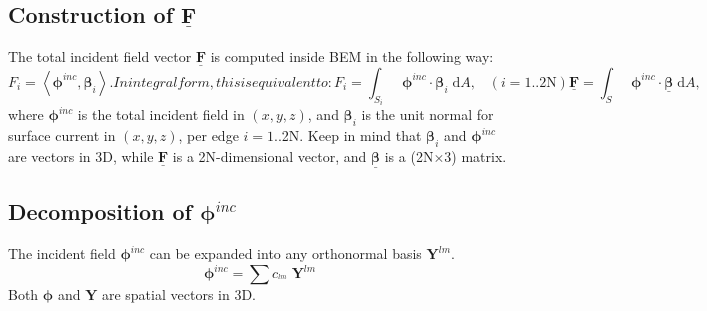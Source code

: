 \documentclass[11pt,letterpaper]{article}
\newcommand{\diff}{\mathrm{d}}
\newcommand{\Fvec}{\underline{\mathbf{F}}}
\begin{document}
\begin{multicols}{2}
\subsection*{Construction of $\Fvec$}
The total incident field vector $\Fvec$ is computed inside BEM in the following way:
\begin{subequations}
\begin{equation}
F_{i} =\left\langle \boldsymbol\phi^{inc},\boldsymbol\beta_{i}\right\rangle.
\end{equation}
In integral form, this is equivalent to: 
\begin{equation}\label{eq:FveciInt}
\boxed{F_{i} = \int_{S_i}\;\; \boldsymbol\phi^{inc}\cdot \boldsymbol\beta_{i} \;\diff A,\;\;\;(i=1..\text{2N})}
\end{equation}
\begin{equation}\label{eq:FvecInt}
\boxed{\Fvec = \int_{S}\;\; \boldsymbol\phi^{inc}\cdot \underline{\boldsymbol\beta} \;\diff A,}
\end{equation}
\end{subequations}
where $\boldsymbol\phi^{inc}$ is the total incident field in $(x,y,z)$, and $\boldsymbol\beta_{i}$ is the unit normal for surface current in $(x,y,z)$, per edge $i=1$..2N. Keep in mind that $\boldsymbol\beta_{i}$ and $\boldsymbol\phi^{inc}$ are vectors in 3D, while $\Fvec$ is a 2N-dimensional vector, and $\underline{\boldsymbol\beta}$ is a (2N$\times$3) matrix. 

\subsection*{Decomposition of $\boldsymbol\phi^{inc}$ }
The incident field $\boldsymbol\phi^{inc}$ can be expanded into any orthonormal basis $\mathbf{Y}^{lm}$.
\begin{equation}
\boldsymbol\phi^{inc}=\sum c_{^{lm}}\;\mathbf{Y}^{lm}
\end{equation}
Both $\boldsymbol\phi$ and $\mathbf{Y}$ are spatial vectors in 3D. 


\end{multicols}
\end{document}
